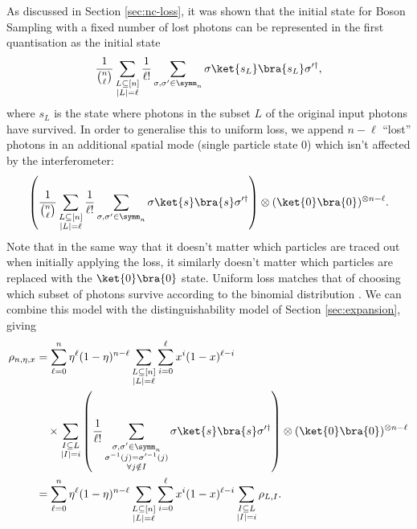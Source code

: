 As discussed in Section \ref{sec:nc-loss}, it was shown that the initial state for Boson Sampling with a fixed number of lost photons can be represented in the first quantisation as the initial state
\begin{equation}
\frac{1}{\binom{n}{\ell}}\sum_{\substack{L\subseteq[n]\\|L|=\ell}}\frac{1}{\ell!}\sum_{\sigma,\sigma'\in\symm_n}\sigma\ket{s_L}\bra{s_L}\sigma'^\dagger,
\end{equation}
where $s_L$ is the state where photons in the subset $L$ of the original input photons have survived. 
In order to generalise this to uniform loss, we append $n-\ell$ ``lost'' photons in an additional spatial mode (single particle state $0$) which isn't affected by the interferometer:
\begin{align}
\left(\frac{1}{\binom{n}{\ell}}\sum_{\substack{L\subseteq[n]\\|L|=\ell}}\frac{1}{\ell!}\sum_{\sigma,\sigma'\in\symm_n}\sigma\ket{s}\bra{s}\sigma'^\dagger\right)\otimes(\ket{0}\bra{0})^{\otimes n-\ell}.
\end{align}
Note that in the same way that it doesn't matter which particles are traced out when initially applying the loss, it similarly doesn't matter which particles are replaced with the $\ket{0}\bra{0}$ state. 
Uniform loss matches that of choosing which subset of photons survive according to the binomial distribution \cite{oszmaniec2018,renema2018loss}. 
We can combine this model with the distinguishability model of Section \ref{sec:expansion}, giving
\begin{align}
\rho_{n,\eta,x}&=\sum_{\ell=0}^n\eta^\ell(1-\eta)^{n-\ell}\sum_{\substack{L\subseteq[n]\\|L|=\ell}}\sum_{i=0}^\ell x^i(1-x)^{\ell-i}\nonumber\\
&\quad\times\sum_{\substack{I\subseteq L\\|I|=i}}\left(\frac{1}{\ell!}\sum_{\substack{\sigma,\sigma'\in\symm_n\\\sigma^{-1}(j)=\sigma'^{-1}(j)\\\forall j \notin I}}\sigma\ket{s}\bra{s}\sigma'^\dagger\right)\otimes(\ket{0}\bra{0})^{\otimes n-\ell}\\
&=\sum_{\ell=0}^n\eta^\ell(1-\eta)^{n-\ell}\sum_{\substack{L\subseteq[n]\\|L|=\ell}}\sum_{i=0}^\ell x^i(1-x)^{\ell-i}\sum_{\substack{I\subseteq L\\|I|=i}}\rho_{L,I}.
\end{align}

